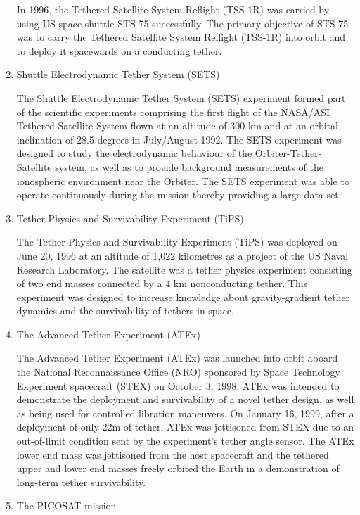 \begin{enumerate}
\begin{enumerate}
\end{enumerate}

In 1996, the Tethered Satellite System Reflight (TSS-1R) was carried by using US space shuttle STS-75 successfully. The primary objective of STS-75 was to carry the Tethered Satellite System Reflight (TSS-1R) into orbit and to deploy it spacewards on a conducting tether.
\item{Shuttle Electrodynamic Tether System (SETS)}

The Shuttle Electrodynamic Tether System (SETS) experiment formed part of the scientific experiments comprising the first flight of the NASA/ASI Tethered-Satellite System flown at an altitude of 300 km and at an orbital inclination of 28.5 degrees in July/August 1992. The SETS experiment was designed to study the electrodynamic behaviour of the Orbiter-Tether-Satellite system, as well as to provide background measurements of the ionospheric environment near the Orbiter. The SETS experiment was able to operate continuously during the mission thereby providing a large data set.

\item{Tether Physics and Survivability Experiment (TiPS)}

The Tether Physics and Survivability Experiment (TiPS) was deployed on June 20, 1996 at an altitude of 1,022 kilometres as a project of the US Naval Research Laboratory. The satellite was a tether physics experiment consisting of two end masses connected by a 4 km nonconducting tether. This experiment was designed to increase knowledge about gravity-gradient tether dynamics and the survivability of tethers in space.

\item{The Advanced Tether Experiment (ATEx)}

The Advanced Tether Experiment (ATEx) was launched into orbit aboard the National Reconnaissance Office (NRO) sponsored by Space Technology Experiment spacecraft (STEX) on October 3, 1998. ATEx was intended to demonstrate the deployment and survivability of a novel tether design, as well as being used for controlled libration maneuvers. On January 16, 1999, after a deployment of only 22m of tether, ATEx was jettisoned from STEX due to an out-of-limit condition sent by the experiment's tether angle sensor. The ATEx lower end mass was jettisoned from the host spacecraft and the tethered upper and lower end masses freely orbited the Earth in a demonstration of long-term tether survivability. 
\item{The PICOSAT mission}


\end{enumerate}
